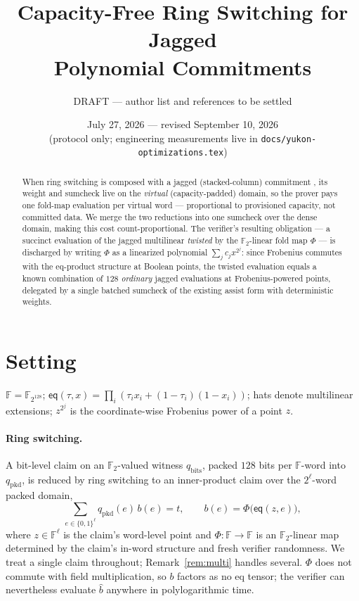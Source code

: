 \documentclass[11pt]{article}
\title{Capacity-Free Ring Switching for Jagged\\ Polynomial Commitments}
\author{DRAFT --- author list and references to be settled}
\date{July 27, 2026 --- revised September 10, 2026\\
{\small (protocol only; engineering measurements live in
\texttt{docs/yukon-optimizations.tex})}}
\newcommand{\F}{\mathbb{F}}
\newcommand{\Ftwo}{\F_2}
\newcommand{\eq}{\mathsf{eq}}
\newcommand{\qpkd}{q_{\mathrm{pkd}}}
\newcommand{\qbits}{q_{\mathrm{bits}}}
\begin{document}
\maketitle

\begin{abstract}
When ring switching \cite{dp-ringswitch} is composed with a jagged
(stacked-column) commitment \cite{jagged}, its weight and sumcheck live
on the \emph{virtual} (capacity-padded) domain, so the prover pays one
fold-map evaluation per virtual word --- proportional to provisioned
capacity, not committed data. We merge the two reductions into one
sumcheck over the dense domain, making this cost count-proportional.
The verifier's resulting obligation --- a succinct evaluation of the
jagged multilinear \emph{twisted} by the $\Ftwo$-linear fold map $\Phi$
--- is discharged by writing $\Phi$ as a linearized polynomial
$\sum_j c_j x^{2^j}$: since Frobenius commutes with the eq-product
structure at Boolean points, the twisted evaluation equals a known
combination of $128$ \emph{ordinary} jagged evaluations at
Frobenius-powered points, delegated by a single batched sumcheck of the
existing assist form with deterministic weights.
\end{abstract}

\section{Setting}\label{sec:setting}

$\F = \F_{2^{128}}$; $\eq(\tau, x) = \prod_i (\tau_i x_i +
(1{-}\tau_i)(1{-}x_i))$; hats denote multilinear extensions; $z^{2^j}$
is the coordinate-wise Frobenius power of a point $z$.

\paragraph{Ring switching.} A bit-level claim on an $\Ftwo$-valued
witness $\qbits$, packed $128$ bits per $\F$-word into $\qpkd$, is
reduced by ring switching to an inner-product claim over the
$2^{\ell}$-word packed domain,
\begin{equation}\label{eq:rs}
  \textstyle\sum_{e \in \{0,1\}^{\ell}} \qpkd(e)\, b(e) = t,
  \qquad
  b(e) = \Phi\bigl(\eq(z, e)\bigr),
\end{equation}
where $z \in \F^{\ell}$ is the claim's
word-level point and $\Phi : \F \to \F$ is an $\Ftwo$-linear map
determined by the claim's in-word structure and fresh verifier
randomness. We treat a single claim throughout;
Remark~\ref{rem:multi} handles several. $\Phi$ does not commute with
field multiplication, so $b$ factors as no eq tensor; the verifier can
nevertheless evaluate $\hat b$ anywhere in polylogarithmic time.
\end{document}
